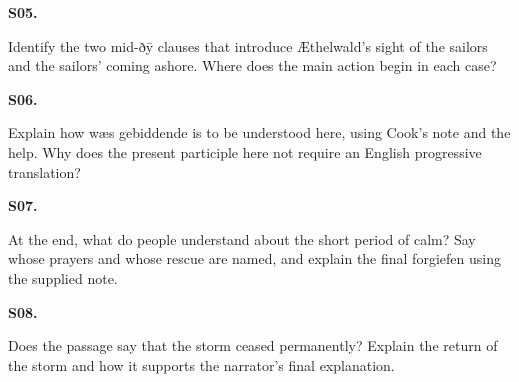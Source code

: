 \par\begin{minipage}{\linewidth}\raggedright
\textbf{S05.}

Identify the two mid-ðȳ clauses that introduce Æthelwald’s sight of the sailors and the sailors’ coming ashore. Where does the main action begin in each case?

\end{minipage}\par\addvspace{4pt}

\par\begin{minipage}{\linewidth}\raggedright
\textbf{S06.}

Explain how wæs gebiddende is to be understood here, using Cook’s note and the help. Why does the present participle here not require an English progressive translation?

\end{minipage}\par\addvspace{4pt}

\par\begin{minipage}{\linewidth}\raggedright
\textbf{S07.}

At the end, what do people understand about the short period of calm? Say whose prayers and whose rescue are named, and explain the final forgiefen using the supplied note.

\end{minipage}\par\addvspace{4pt}

\par\begin{minipage}{\linewidth}\raggedright
\textbf{S08.}

Does the passage say that the storm ceased permanently? Explain the return of the storm and how it supports the narrator’s final explanation.

\end{minipage}\par\addvspace{4pt}

